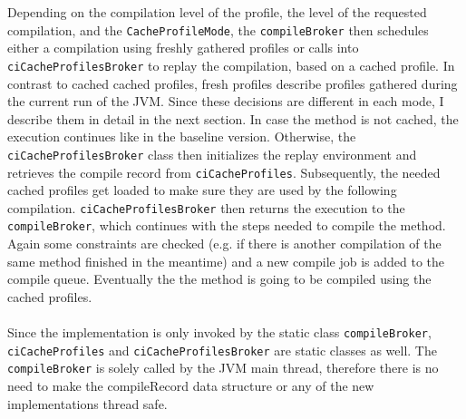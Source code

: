 Depending on the compilation level of the profile, the level of the requested compilation, and the \texttt{CacheProfileMode}, the \texttt{compileBroker} then schedules either a compilation using freshly gathered profiles or calls into \texttt{ciCacheProfilesBroker} to replay the compilation, based on a cached profile. In contrast to cached cached profiles, fresh profiles describe profiles gathered during the current run of the JVM. Since these decisions are different in each mode, I describe them in detail in the next section.
In case the method is not cached, the execution continues like in the baseline version.
Otherwise, the \texttt{ciCacheProfilesBroker} class then initializes the replay environment and retrieves the compile record from \texttt{ciCacheProfiles}. Subsequently, the needed cached profiles get loaded to make sure they are used by the following compilation. \texttt{ciCacheProfilesBroker} then returns the execution to the \texttt{compileBroker}, which continues with the steps needed to compile the method. Again some constraints are checked (e.g. if there is another compilation of the same method finished in the meantime) and a new compile job is added to the compile queue. Eventually the the method is going to be compiled using the cached profiles.
\\\\
Since the implementation is only invoked by the static class \texttt{compileBroker}, \texttt{ciCacheProfiles} and \texttt{ciCacheProfilesBroker} are static classes as well. The \texttt{compileBroker} is solely called by the JVM main thread, therefore there is no need to make the compileRecord data structure or any of the new implementations thread safe. 


